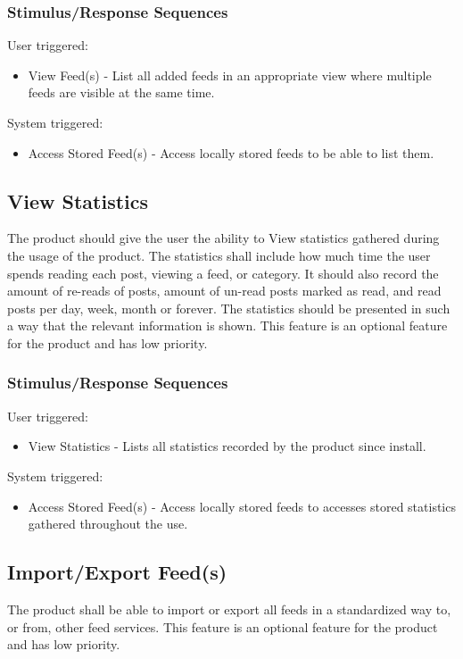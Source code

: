 \subsubsection{Stimulus/Response Sequences}
User triggered:
\begin{itemize}
  \item View Feed(s) - List all added feeds in an appropriate view where multiple feeds are visible at the same time.
\end{itemize}
System triggered:
\begin{itemize}
  \item Access Stored Feed(s) - Access locally stored feeds to be able to list them.
\end{itemize}


\subsection{View Statistics}
The product should give the user the ability to View statistics gathered during the usage of the product. The statistics shall include how much time the user spends reading each post, viewing a feed, or category. It should also record the amount of re-reads of posts, amount of un-read posts marked as read, and read posts per day, week, month or forever. The statistics should be presented in such a way that the relevant information is shown. This feature is an optional feature for the product and has low priority.


\subsubsection{Stimulus/Response Sequences}
User triggered:
\begin{itemize}
  \item View Statistics - Lists all statistics recorded by the product since install.
\end{itemize}
System triggered:
\begin{itemize}
  \item Access Stored Feed(s) - Access locally stored feeds to accesses stored statistics gathered throughout the use.
\end{itemize}


\subsection{Import/Export Feed(s)}
The product shall be able to import or export all feeds in a standardized way to, or from, other feed services. This feature is an optional feature for the product and has low priority.


